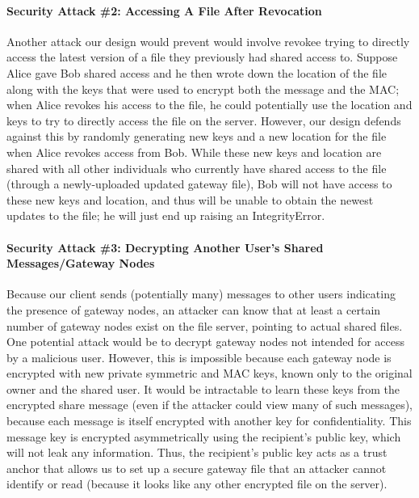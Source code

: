 \documentclass[12pt]{exam}
\begin{document}
\paragraph{Security Attack \#2: Accessing A File After Revocation} Another attack our design would prevent would involve revokee trying to directly access the latest version of a file they previously had shared access to. Suppose Alice gave Bob shared access and he then wrote down the location of the file along with the keys that were used to encrypt both the message and the MAC; when Alice revokes his access to the file, he could potentially use the location and keys to try to directly access the file on the server. However, our design defends against this by randomly generating new keys and a new location for the file when Alice revokes access from Bob. While these new keys and location are shared with all other individuals who currently have shared access to the file (through a newly-uploaded updated gateway file), Bob will not have access to these new keys and location, and thus will be unable to obtain the newest updates to the file; he will just end up raising an IntegrityError.

\paragraph{Security Attack \#3: Decrypting Another User's Shared Messages/Gateway Nodes} Because our client sends (potentially many) messages to other users indicating the presence of gateway nodes, an attacker can know that at least a certain number of gateway nodes exist on the file server, pointing to actual shared files. One potential attack would be to decrypt gateway nodes not intended for access by a malicious user. However, this is impossible because each gateway node is encrypted with new private symmetric and MAC keys, known only to the original owner and the shared user. It would be intractable to learn these keys from the encrypted share message (even if the attacker could view many of such messages), because each message is itself encrypted with another key for confidentiality. This message key is encrypted asymmetrically using the recipient's public key, which will not leak any information. Thus, the recipient's public key acts as a trust anchor that allows us to set up a secure gateway file that an attacker cannot identify or read (because it looks like any other encrypted file on the server).
\end{document}
